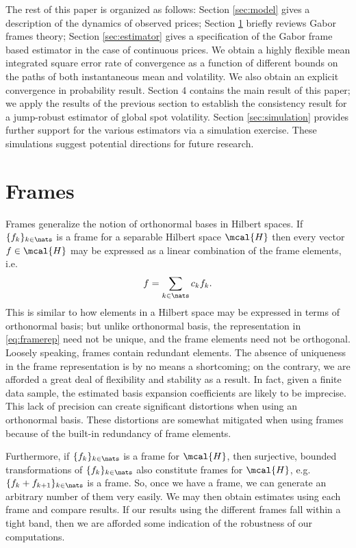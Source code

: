 \documentclass[a4paper, 12pt]{article}
\newcommand{\sumn}{\ensuremath{\sum_{k \in \nats}}\xspace}
\newcommand{\hs}{\ensuremath{\mcal{H}}\xspace}
\begin{document}
The rest of this paper is organized as follows: Section \ref{sec:model} gives a description of the dynamics of  observed prices; Section \ref{sec:gabor} briefly reviews  Gabor frames theory; Section \ref{sec:estimator} gives a specification of the Gabor frame based estimator  in the case of continuous prices. We obtain a highly flexible mean integrated square error rate of convergence as a function of different bounds on the paths of both instantaneous mean and volatility. We also obtain an explicit  convergence in probability result.   Section 4 contains the main result of this paper; we apply the results of the previous section to establish the consistency result for a jump-robust estimator of global spot volatility.  Section \ref{sec:simulation} provides further support for the various estimators via a simulation exercise. These simulations suggest potential directions for future research. 

\section{ Frames}\label{sec:gabor} 
Frames generalize the notion of orthonormal bases in  Hilbert spaces. If $\{f_k\}_{k \in \nats}$ is a frame for a separable Hilbert space \hs then every vector $f \in \hs$ may be expressed as a linear combination of the frame elements, i.e.
\begin{align}
  f = \sumn c_k f_k.
  \label{eq:framerep}
\end{align}
This is similar to how elements in a Hilbert space may be expressed in terms of orthonormal basis; but unlike orthonormal basis, the representation in \eqref{eq:framerep} need not be unique, and the frame elements need not be orthogonal. Loosely speaking, frames contain redundant elements. The absence of uniqueness in the frame representation is by no means a shortcoming; on the contrary, we are afforded a great deal of flexibility and stability as a result. In fact, given a finite data sample, the estimated basis expansion coefficients are likely to be imprecise. This lack of precision can create significant distortions when using an orthonormal basis. These distortions are somewhat mitigated when using frames because of the built-in redundancy of frame elements. 



Furthermore, if $\{f_k\}_{k \in \nats}$ is a frame for \hs, then surjective, bounded  transformations of $\{f_k\}_{k \in \nats}$  also constitute frames for \hs, e.g. $\{f_k + f_{k+1}\}_{k \in \nats}$ is a frame. So, once we have a frame, we can generate an arbitrary number of them very easily. We may then obtain estimates using each frame and compare results. If our results using the different frames fall within a tight band, then we are afforded some indication of the robustness of our computations.   
\end{document}
